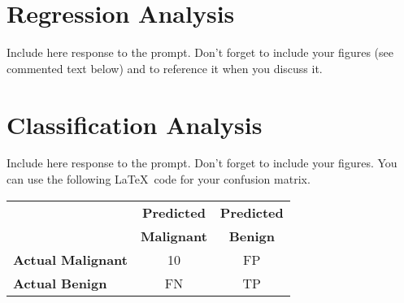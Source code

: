 \documentclass[letterpaper, 11pt]{amsart}
\newcommand{\DAR}[1]{\textcolor{granitepeak}{#1}}
\begin{document}
\section{Regression Analysis}
\DAR{Include here response to the prompt. Don't forget to include your figures (see commented text below) and to reference it when you discuss it. }



\section{Classification Analysis}
\DAR{Include here response to the prompt. Don't forget to include your figures. You can use the following \LaTeX \, code for your confusion matrix. }

\begin{center}
\begin{tabular}{l|c|c|}
 & \textbf{Predicted} & \textbf{Predicted} \\
 & \textbf{Malignant} & \textbf{Benign} \\
\hline
\textbf{Actual Malignant} & 10 & FP \\
\hline
\textbf{Actual Benign} & FN & TP \\
\hline
\end{tabular}
\end{center}
\end{document}
